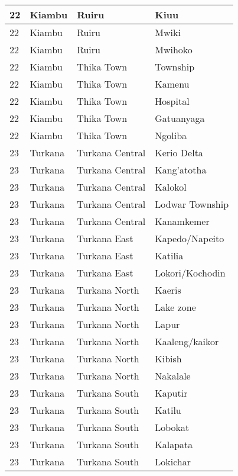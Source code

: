 \begin{table}[!ht]
\begin{tabular}{|l|l|l|l|}
        22 & Kiambu & Ruiru & Kiuu \\ \hline
        22 & Kiambu & Ruiru & Mwiki \\ \hline
        22 & Kiambu & Ruiru & Mwihoko \\ \hline
        22 & Kiambu & Thika Town & Township \\ \hline
        22 & Kiambu & Thika Town & Kamenu \\ \hline
        22 & Kiambu & Thika Town & Hospital \\ \hline
        22 & Kiambu & Thika Town & Gatuanyaga \\ \hline
        22 & Kiambu & Thika Town & Ngoliba \\ \hline
        23 & Turkana & Turkana Central & Kerio Delta \\ \hline
        23 & Turkana & Turkana Central & Kang’atotha \\ \hline
        23 & Turkana & Turkana Central & Kalokol \\ \hline
        23 & Turkana & Turkana Central & Lodwar Township \\ \hline
        23 & Turkana & Turkana Central & Kanamkemer \\ \hline
        23 & Turkana & Turkana East & Kapedo/Napeito \\ \hline
        23 & Turkana & Turkana East & Katilia \\ \hline
        23 & Turkana & Turkana East & Lokori/Kochodin \\ \hline
        23 & Turkana & Turkana North & Kaeris \\ \hline
        23 & Turkana & Turkana North & Lake zone \\ \hline
        23 & Turkana & Turkana North & Lapur \\ \hline
        23 & Turkana & Turkana North & Kaaleng/kaikor \\ \hline
        23 & Turkana & Turkana North & Kibish \\ \hline
        23 & Turkana & Turkana North & Nakalale \\ \hline
        23 & Turkana & Turkana South & Kaputir \\ \hline
        23 & Turkana & Turkana South & Katilu \\ \hline
        23 & Turkana & Turkana South & Lobokat \\ \hline
        23 & Turkana & Turkana South & Kalapata \\ \hline
        23 & Turkana & Turkana South & Lokichar \\ \hline

\end{tabular}
\end{table}
